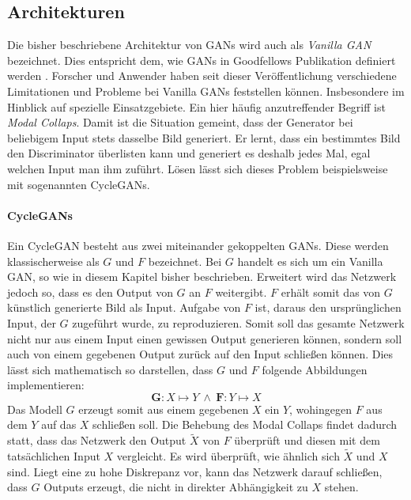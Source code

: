 \subsection{Architekturen}
Die bisher beschriebene Architektur von \acp{GAN} wird auch als \emph{Vanilla \ac{GAN}} bezeichnet. Dies entspricht dem, wie \acp{GAN} in Goodfellows Publikation definiert werden \cite{Goodfellow-et-al-2016}. Forscher und Anwender haben seit dieser Veröffentlichung verschiedene Limitationen und Probleme bei Vanilla \acp{GAN} feststellen können. Insbesondere im Hinblick auf spezielle Einsatzgebiete. Ein hier häufig anzutreffender Begriff ist \emph{Modal Collaps}. Damit ist die Situation gemeint, dass der Generator bei beliebigem Input stets dasselbe Bild generiert. Er lernt, dass ein bestimmtes Bild den Discriminator überlisten kann und generiert es deshalb jedes Mal, egal welchen Input man ihm zuführt. Lösen lässt sich dieses Problem beispielsweise mit sogenannten \acp{CycleGAN}.

\paragraph{CycleGANs}
Ein \ac{CycleGAN} besteht aus zwei miteinander gekoppelten \acp{GAN}. Diese werden klassischerweise als $G$ und $F$ bezeichnet. Bei $G$ handelt es sich um ein Vanilla \ac{GAN}, so wie in diesem Kapitel bisher beschrieben. Erweitert wird das Netzwerk jedoch so, dass es den Output von $G$ an $F$ weitergibt. $F$ erhält somit das von $G$ künstlich generierte Bild als Input. Aufgabe von $F$ ist, daraus den ursprünglichen Input, der $G$ zugeführt wurde, zu reproduzieren. Somit soll das gesamte Netzwerk nicht nur aus einem Input einen gewissen Output generieren können, sondern soll auch von einem gegebenen Output zurück auf den Input schließen können. Dies lässt sich mathematisch so darstellen, dass $G$ und $F$ folgende Abbildungen implementieren:
\begin{equation}
	\mathbf{G}: X\mapsto Y \: \wedge \: \mathbf{F}: Y\mapsto X
\end{equation}
Das Modell $G$ erzeugt somit aus einem gegebenen $X$ ein $Y$, wohingegen $F$ aus dem $Y$ auf das $X$ schließen soll. Die Behebung des Modal Collaps findet dadurch statt, dass das Netzwerk den Output $\tilde{X}$ von $F$ überprüft und diesen mit dem tatsächlichen Input $X$ vergleicht. Es wird überprüft, wie ähnlich sich $\tilde{X}$ und $X$ sind. Liegt eine zu hohe Diskrepanz vor, kann das Netzwerk darauf schließen, dass $G$ Outputs erzeugt, die nicht in direkter Abhängigkeit zu $X$ stehen. 

